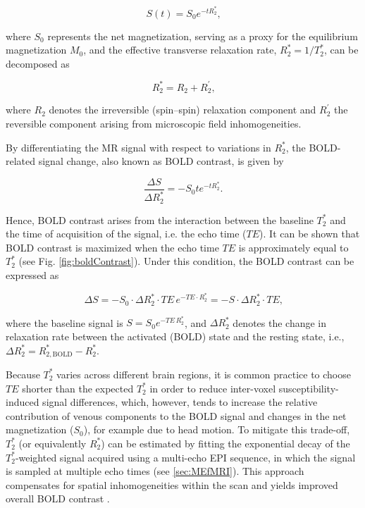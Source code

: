 \begin{equation}\label{eq:st}
    S(t) = S_0 e^{-t R_2^*}\text{,}
\end{equation}

where $S_0$ represents the net magnetization, serving as a proxy for the equilibrium magnetization $M_0$, and the effective transverse relaxation rate, $R_2^* = 1/T_2^*$, can be decomposed as

\begin{equation}
    R_2^* = R_2 + R_2^{\prime}\text{,}
\end{equation}

where $R_2$ denotes the irreversible (spin–spin) relaxation component and $R_2^{\prime}$ the reversible component arising from microscopic field inhomogeneities.

By differentiating the MR signal with respect to variations in $R_2^*$, the BOLD-related signal change, also known as BOLD contrast, is given by

\begin{equation}
    \frac{\Delta S}{\Delta R_2^*} = - S_0 t e^{-t R_2^*}\text{.}
\end{equation}


Hence, BOLD contrast arises from the interaction between the baseline $T_2^*$ and the time of acquisition of the signal, i.e. the echo time ($TE$). It can be shown that BOLD contrast is maximized when the echo time $TE$ is approximately equal to $T_2^*$ (see Fig. \ref{fig:boldContrast}). Under this condition, the BOLD contrast can be expressed as

\begin{equation}
    \Delta S = -S_0 \cdot \Delta R_2^* \cdot TE \, e^{-TE \cdot R_2^*} 
    = -S \cdot\Delta R_2^* \cdot TE\text{,}
\end{equation}

where the baseline signal is $S = S_0 e^{-TE\, R_2^*}$, and $\Delta R_2^*$ denotes the change in relaxation rate between the activated (BOLD) state and the resting state, i.e., $\Delta R_2^* = R_{2,\text{BOLD}}^* - R_2^*$.

Because $T_2^*$ varies across different brain regions, it is common practice to choose $TE$ shorter than the expected $T_2^*$ in order to reduce inter-voxel susceptibility-induced signal differences, which, however, tends to increase the relative contribution of venous components to the BOLD signal \citep{petersT2MeasurementsHuman2007} and changes in the net magnetization ($S_{0}$), for example due to head motion. To mitigate this trade-off, $T_2^*$ (or equivalently $R_2^*$) can be estimated by fitting the exponential decay of the $T_2^*$-weighted signal acquired using a multi-echo EPI sequence, in which the signal is sampled at multiple echo times (see \ref{sec:MEfMRI}). This approach compensates for spatial inhomogeneities within the scan and yields improved overall BOLD contrast \citep{posse1999enhancement}.



